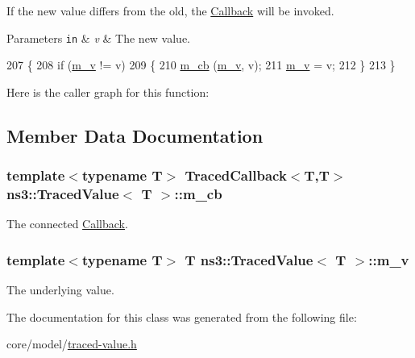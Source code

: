 If the new value differs from the old, the \hyperlink{classns3_1_1Callback}{Callback} will be invoked. 
\begin{DoxyParams}[1]{Parameters}
\mbox{\tt in}  & {\em v} & The new value. \\
\hline
\end{DoxyParams}

\begin{DoxyCode}
207                         \{
208     \textcolor{keywordflow}{if} (\hyperlink{classns3_1_1TracedValue_a72b9ba60e98e4727f60db0896ed79c4c}{m\_v} != v)
209       \{
210         \hyperlink{classns3_1_1TracedValue_a4215ecb475ef435dad916b0d0a0040c5}{m\_cb} (\hyperlink{classns3_1_1TracedValue_a72b9ba60e98e4727f60db0896ed79c4c}{m\_v}, v);
211         \hyperlink{classns3_1_1TracedValue_a72b9ba60e98e4727f60db0896ed79c4c}{m\_v} = v;
212       \}
213   \}
\end{DoxyCode}


Here is the caller graph for this function\+:




\subsection{Member Data Documentation}
\subsubsection[{\texorpdfstring{m\+\_\+cb}{m_cb}}]{\setlength{\rightskip}{0pt plus 5cm}template$<$typename T$>$ {\bf Traced\+Callback}$<$T,T$>$ {\bf ns3\+::\+Traced\+Value}$<$ T $>$\+::m\+\_\+cb\hspace{0.3cm}{\ttfamily [private]}}\hypertarget{classns3_1_1TracedValue_a4215ecb475ef435dad916b0d0a0040c5}{}\label{classns3_1_1TracedValue_a4215ecb475ef435dad916b0d0a0040c5}
The connected \hyperlink{classns3_1_1Callback}{Callback}. 
\subsubsection[{\texorpdfstring{m\+\_\+v}{m_v}}]{\setlength{\rightskip}{0pt plus 5cm}template$<$typename T$>$ T {\bf ns3\+::\+Traced\+Value}$<$ T $>$\+::m\+\_\+v\hspace{0.3cm}{\ttfamily [private]}}\hypertarget{classns3_1_1TracedValue_a72b9ba60e98e4727f60db0896ed79c4c}{}\label{classns3_1_1TracedValue_a72b9ba60e98e4727f60db0896ed79c4c}
The underlying value. 

The documentation for this class was generated from the following file\+:\begin{DoxyCompactItemize}
\item 
core/model/\hyperlink{traced-value_8h}{traced-\/value.\+h}\end{DoxyCompactItemize}
